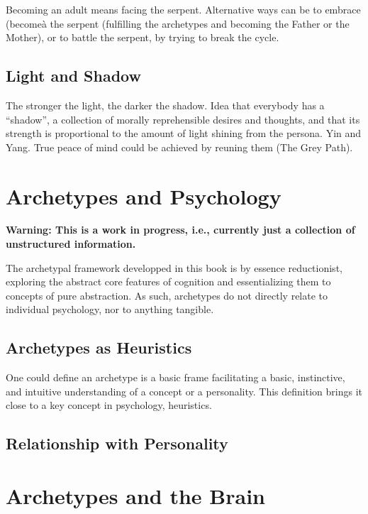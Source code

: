 \documentclass[]{book}
\begin{document}
Becoming an adult means facing the serpent. Alternative ways can be to embrace (becomeà the serpent (fulfilling the archetypes and becoming the Father or the Mother), or to battle the serpent, by trying to break the cycle.

\hypertarget{light-and-shadow}{%
\section{Light and Shadow}\label{light-and-shadow}}

The stronger the light, the darker the shadow.
Idea that everybody has a ``shadow'', a collection of morally reprehensible desires and thoughts, and that its strength is proportional to the amount of light shining from the persona. Yin and Yang. True peace of mind could be achieved by reuning them (The Grey Path).

\hypertarget{archetypes-and-psychology}{%
\chapter{Archetypes and Psychology}\label{archetypes-and-psychology}}

\textbf{Warning: This is a work in progress, i.e., currently just a collection of unstructured information.}

The archetypal framework developped in this book is by essence reductionist, exploring the abstract core features of cognition and essentializing them to concepts of pure abstraction. As such, archetypes do not directly relate to individual psychology, nor to anything tangible.

\hypertarget{archetypes-as-heuristics}{%
\section{Archetypes as Heuristics}\label{archetypes-as-heuristics}}

One could define an archetype is a basic frame facilitating a basic, instinctive, and intuitive understanding of a concept or a personality. This definition brings it close to a key concept in psychology, heuristics.

\hypertarget{relationship-with-personality}{%
\section{Relationship with Personality}\label{relationship-with-personality}}

\hypertarget{archetypes-and-the-brain}{%
\chapter{Archetypes and the Brain}\label{archetypes-and-the-brain}}
\end{document}
